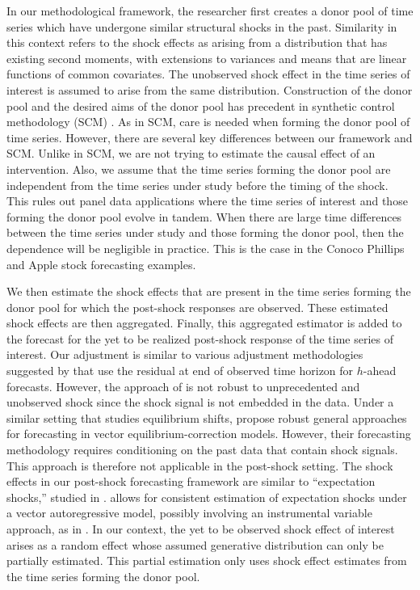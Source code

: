 \documentclass[11pt,3p,review,authoryear]{elsarticle}
\theoremstyle{definition}
\begin{document}
In our methodological framework, the researcher first creates a donor pool of time series which have undergone similar structural shocks in the past. Similarity in this context refers to the shock effects as arising from a distribution that has existing second moments, with extensions to variances and means that are linear functions of common covariates. The unobserved shock effect in the time series of interest is assumed to arise from the same distribution. Construction of the donor pool and the desired aims of the donor pool has precedent in synthetic control methodology (SCM) \citep{abadie2010synthetic}. As in SCM, care is needed when forming the donor pool of time series. However, there are several key differences between our framework and SCM. Unlike in SCM, we are not trying to estimate the causal effect of an intervention. Also, we assume that the time series forming the donor pool are independent from the time series under study before the timing of the shock. This rules out panel data applications where the time series of interest and those forming the donor pool evolve in tandem. When there are large time differences between the time series under study and those forming the donor pool, then the dependence will be negligible in practice. This is the case in the Conoco Phillips and Apple stock forecasting examples.

We then estimate the shock effects that are present in the time series forming the donor pool for which the post-shock responses are observed. These estimated shock effects are then aggregated. Finally, this aggregated estimator is added to the forecast for the yet to be realized post-shock response of the time series of interest. Our adjustment is similar to various adjustment methodologies suggested by \cite{clements1996intercept} that use the residual at end of observed time horizon for $h$-ahead forecasts. However, the approach of \cite{clements1996intercept} is not robust to unprecedented and unobserved shock since the shock signal is not embedded in the data. Under a similar setting that studies equilibrium shifts, \cite{castle2015robust} propose robust general approaches for forecasting in vector equilibrium-correction models. However, their forecasting methodology requires conditioning on the past data that contain shock signals. This approach is therefore not applicable in the post-shock setting. The shock effects in our post-shock forecasting framework are similar to ``expectation shocks,'' studied in \cite{clements2019measuring}. \cite{clements2019measuring} allows for consistent estimation of expectation shocks under a vector autoregressive model, possibly involving an instrumental variable approach, as in \cite{croushore2006data}. In our context, the yet to be observed shock effect of interest arises as a random effect whose assumed generative distribution can only be partially estimated. This partial estimation only uses shock effect estimates from the time series forming the donor pool. 
\end{document}

